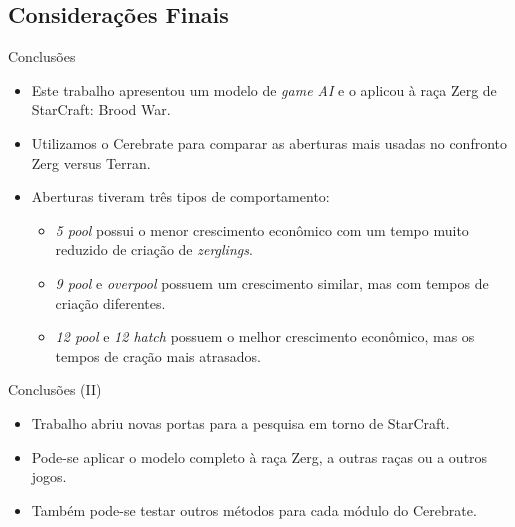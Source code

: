 \documentclass{beamer}
\begin{document}
\subsection{Considerações Finais}
\begin{frame}{Conclusões}
\begin{itemize}
  \item Este trabalho apresentou um modelo de \emph{game AI} e o aplicou à raça Zerg de StarCraft: Brood War.
  \item Utilizamos o Cerebrate para comparar as aberturas mais usadas no confronto Zerg versus Terran.
  \item Aberturas tiveram três tipos de comportamento:
    \begin{itemize}
      \item \emph{5 pool} possui o menor crescimento econômico com um tempo muito reduzido de criação de \emph{zerglings}.
      \item \emph{9 pool} e \emph{overpool} possuem um crescimento similar, mas com tempos de criação diferentes.
      \item \emph{12 pool} e \emph{12 hatch} possuem o melhor crescimento econômico, mas os tempos de cração mais atrasados.
    \end{itemize}
\end{itemize}
\end{frame}
\begin{frame}{Conclusões (II)}
\begin{itemize}
  \item Trabalho abriu novas portas para a pesquisa em torno de StarCraft.
  \item Pode-se aplicar o modelo completo à raça Zerg, a outras raças ou a outros jogos.
  \item Também pode-se testar outros métodos para cada módulo do Cerebrate.
\end{itemize}
\end{frame}
\begin{frame}[plain,t]
\end{frame}
\end{document}
